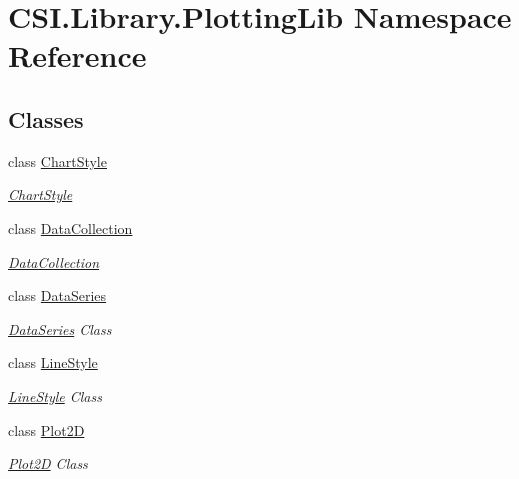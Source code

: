\hypertarget{namespace_c_s_i_1_1_library_1_1_plotting_lib}{}\section{C\+S\+I.\+Library.\+Plotting\+Lib Namespace Reference}
\label{namespace_c_s_i_1_1_library_1_1_plotting_lib}
\subsection*{Classes}
\begin{DoxyCompactItemize}
\item 
class \mbox{\hyperlink{class_c_s_i_1_1_library_1_1_plotting_lib_1_1_chart_style}{Chart\+Style}}
\begin{DoxyCompactList}\small\item\em \mbox{\hyperlink{class_c_s_i_1_1_library_1_1_plotting_lib_1_1_chart_style}{Chart\+Style}} \end{DoxyCompactList}\item 
class \mbox{\hyperlink{class_c_s_i_1_1_library_1_1_plotting_lib_1_1_data_collection}{Data\+Collection}}
\begin{DoxyCompactList}\small\item\em \mbox{\hyperlink{class_c_s_i_1_1_library_1_1_plotting_lib_1_1_data_collection}{Data\+Collection}} \end{DoxyCompactList}\item 
class \mbox{\hyperlink{class_c_s_i_1_1_library_1_1_plotting_lib_1_1_data_series}{Data\+Series}}
\begin{DoxyCompactList}\small\item\em \mbox{\hyperlink{class_c_s_i_1_1_library_1_1_plotting_lib_1_1_data_series}{Data\+Series}} Class \end{DoxyCompactList}\item 
class \mbox{\hyperlink{class_c_s_i_1_1_library_1_1_plotting_lib_1_1_line_style}{Line\+Style}}
\begin{DoxyCompactList}\small\item\em \mbox{\hyperlink{class_c_s_i_1_1_library_1_1_plotting_lib_1_1_line_style}{Line\+Style}} Class \end{DoxyCompactList}\item 
class \mbox{\hyperlink{class_c_s_i_1_1_library_1_1_plotting_lib_1_1_plot2_d}{Plot2D}}
\begin{DoxyCompactList}\small\item\em \mbox{\hyperlink{class_c_s_i_1_1_library_1_1_plotting_lib_1_1_plot2_d}{Plot2D}} Class \end{DoxyCompactList}\end{DoxyCompactItemize}
